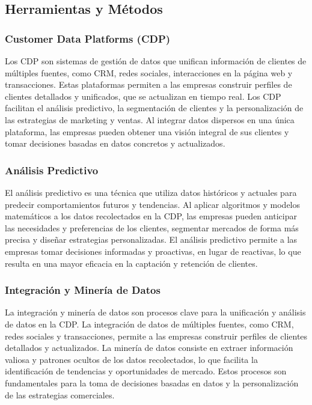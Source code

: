 \documentclass[12pt]{article}
\begin{document}
\subsection{Herramientas y Métodos}
\subsubsection{Customer Data Platforms (CDP)}
\noindent
Los CDP son sistemas de gestión de datos que unifican información de clientes de múltiples fuentes, como CRM, redes sociales, interacciones en la página web y transacciones. Estas plataformas permiten a las empresas construir perfiles de clientes detallados y unificados, que se actualizan en tiempo real. Los CDP facilitan el análisis predictivo, la segmentación de clientes y la personalización de las estrategias de marketing y ventas. Al integrar datos dispersos en una única plataforma, las empresas pueden obtener una visión integral de sus clientes y tomar decisiones basadas en datos concretos y actualizados.

\subsubsection{Análisis Predictivo}
\noindent
El análisis predictivo es una técnica que utiliza datos históricos y actuales para predecir comportamientos futuros y tendencias. Al aplicar algoritmos y modelos matemáticos a los datos recolectados en la CDP, las empresas pueden anticipar las necesidades y preferencias de los clientes, segmentar mercados de forma más precisa y diseñar estrategias personalizadas. El análisis predictivo permite a las empresas tomar decisiones informadas y proactivas, en lugar de reactivas, lo que resulta en una mayor eficacia en la captación y retención de clientes.

\subsubsection{Integración y Minería de Datos}
\noindent
La integración y minería de datos son procesos clave para la unificación y análisis de datos en la CDP. La integración de datos de múltiples fuentes, como CRM, redes sociales y transacciones, permite a las empresas construir perfiles de clientes detallados y actualizados. La minería de datos consiste en extraer información valiosa y patrones ocultos de los datos recolectados, lo que facilita la identificación de tendencias y oportunidades de mercado. Estos procesos son fundamentales para la toma de decisiones basadas en datos y la personalización de las estrategias comerciales.
\end{document}
